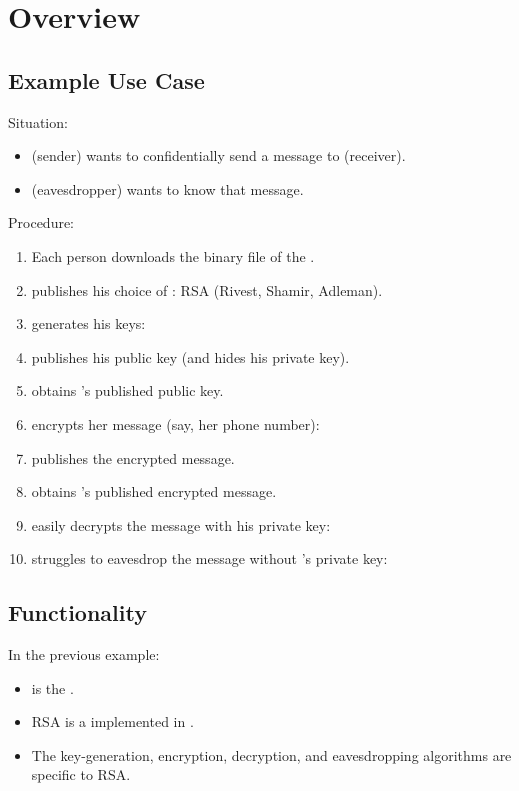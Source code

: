 \section{Overview}


\subsection{Example Use Case}

Situation:
\begin{itemize}
\item
  \alice{} (sender) wants to confidentially send a message
  to \bob{} (receiver).
\item
  \eve{} (eavesdropper) wants to know that message.
\end{itemize}

Procedure:
\begin{enumerate}
\item
  Each person downloads the binary file 
  of the \cry{} \cf.
\item
  \bob{} publishes his choice of \cs:
  RSA (Rivest, Shamir, Adleman).
\item
  \bob{} generates his keys: \getkeysex
\item
  \bob{} publishes his public key
  (and hides his private key).
\item
  \alice{} obtains \bob's published public key.
\item
  \alice{} encrypts her message (say, her phone number):
  \encryptex
\item
  \alice{} publishes the encrypted message.
\item
  \bob{} obtains \alice's published encrypted message.
\item
  \bob{} easily decrypts the message with his private key:
  \decryptex
\item
  \eve{} struggles to eavesdrop the message
  without \bob's private key: \eavesdropex
\end{enumerate}


\subsection{Functionality}

In the previous example:
\begin{itemize}
\item
  \cry{} is the \cf.
\item
  RSA is a \cs{} implemented in \cry.
\item
  The key-generation, encryption, decryption,
  and eavesdropping algorithms are specific to RSA.
\end{itemize}

